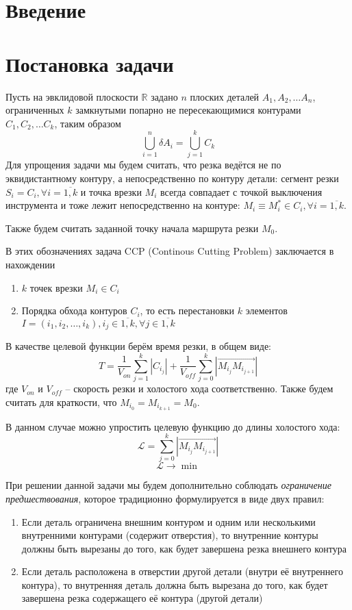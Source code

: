 \documentclass{article}
\begin{document}
\section{Введение}

\section{Постановка задачи}

Пусть на эвклидовой плоскости
$\mathbb R$ задано $n$ плоских деталей
$A_1, A_2, \dots A_n$,
ограниченных $k$ замкнутыми попарно не пересекающимися контурами
$C_1, C_2, \dots C_k$,
таким образом
$$
\bigcup_{i=1}^n \delta A_i = \bigcup_{j=1}^k C_k
$$
Для упрощения задачи мы будем считать,
что резка ведётся не по эквидистантному контуру,
а непосредственно по контуру детали:
сегмент резки
$S_i = C_i, \forall i=\overline{1, k}$
и точка врезки $M_i$ всегда совпадает с точкой выключения
инструмента и тоже лежит непосредственно
на контуре:
$M_i \equiv M_i^* \in C_i, \forall i = \overline{1, k}$.

Также будем считать заданной точку начала маршрута резки $M_0$.

В этих обозначениях задача CCP
(Continous Cutting Problem)
заключается в нахождении
\begin{enumerate}
    \item{$k$ точек врезки $M_i \in C_i$}
    \item{Порядка обхода контуров $C_i$,
    то есть перестановки $k$ элементов
    $I=(i_1, i_2, \dots, i_k),
    i_j \in \overline{1,k}, \forall j \in \overline{1,k}$}
\end{enumerate}

В качестве целевой функции берём время резки,
в общем виде:
$$
T = \frac{1}{V_{on}} \sum_{j=1}^k |C_{i_j}| +
\frac{1}{V_{off}} \sum_{j=0}^k |\overrightarrow{M_{i_j} M_{i_{{j+1}}}}|
$$
где $V_{on}$ и $V_{off}$ --
скорость резки и холостого хода соответственно. 
Также будем считать для краткости,
что
$M_{i_0} = M_{i_{k+1}} = M_0$.

В данном случае можно упростить целевую функцию
до длины холостого хода:
$$
\mathcal L = \sum_{j=0}^k |\overrightarrow{M_{i_j} M_{i_{{j+1}}}}|
$$
$$
\mathcal L \to \min
$$

При решении данной задачи мы будем дополнительно
соблюдать
\textit{ограничение предшествования},
которое традиционно формулируется в виде двух правил:
\begin{enumerate}
\item{}
Если деталь ограничена внешним контуром и одним
или несколькими внутренними контурами
(содержит отверстия),
то внутренние контуры должны
быть вырезаны до того,
как будет завершена резка внешнего контура
\item{}
Если деталь расположена в отверстии
другой детали
(внутри её внутреннего контура),
то внутренняя деталь
должна быть вырезана до того,
как будет завершена резка
содержащего её контура
(другой детали)
\end{enumerate}
\end{document}
